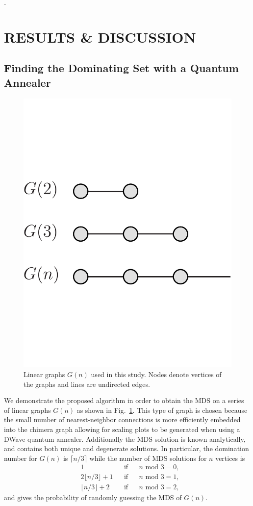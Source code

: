 -\documentclass[prd,twocolumn,tightenlines,preprintnumbers,showpacs,superscriptaddress,notitlepage,nofootinbib,eqsecnum,floatfix,longbibliography]{revtex4}
\begin{document}
\section{RESULTS \& DISCUSSION}
\label{sec:results}

\subsection{Finding the Dominating Set with a Quantum Annealer}
\label{sec:discussion:qa}

\begin{figure}[b]
    \centering
        \includegraphics[width=0.5\columnwidth]{./figures/linear_crop.pdf}
    \caption{Linear graphs $G(n)$ used in this study.
Nodes denote vertices of the graphs and lines are undirected edges.}
    \label{fig:linear}
\end{figure}

We demonstrate the proposed algorithm in order to obtain the MDS on a series of linear graphs $G(n)$ as shown in Fig.~\ref{fig:linear}.
This type of graph is chosen because the small number of nearest-neighbor connections is more efficiently embedded into the chimera graph allowing for scaling plots to be generated when using a DWave quantum annealer.
Additionally the MDS solution is known analytically, and contains both unique and degenerate solutions.
In particular, the domination number for $G(n)$ is $\lceil n/3 \rceil$ while the number of MDS solutions for $n$ vertices is
\begin{align}
    &1 &&\textrm{if} && n\textrm{ mod }3=0,\nonumber \\
    &2\lfloor n/3 \rfloor + 1 && \textrm{if}&& n\textrm{ mod }3=1,\nonumber \\
    &\lfloor n/3 \rfloor + 2 && \textrm{if} && n \textrm{ mod }3 = 2,
\end{align}
and gives the probability of randomly guessing the MDS of $G(n)$.
\end{document}
